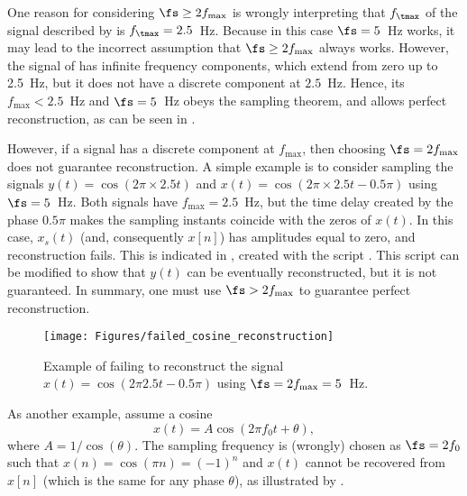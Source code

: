 One reason for considering $\fs \ge 2 f_{\textrm{max}}$ is wrongly interpreting that $f_\tmax$ of the signal described by  is $f_\tmax=2.5$~Hz. Because in this case $\fs = 5$~Hz works, it may lead to the incorrect assumption that $\fs \ge 2 f_{\textrm{max}}$ always works.
However, the signal of  has infinite frequency components, which extend from zero up to 2.5~Hz, but it does
not have a discrete component at $2.5$~Hz. Hence, its $f_{\textrm{max}} < 2.5$~Hz and $\fs = 5$~Hz obeys the sampling theorem, and allows perfect reconstruction, as can be seen in .

However, if a signal has a discrete component at $f_{\textrm{max}}$, then choosing $\fs = 2 f_{\textrm{max}}$ does not guarantee
reconstruction. A simple example is to consider sampling the signals 
$y(t) = \cos (2 \pi \times 2.5 t)$ and $x(t) = \cos (2 \pi \times 2.5 t - 0.5 \pi)$ using $\fs = 5$~Hz. Both signals have $f_{\textrm{max}} = 2.5$~Hz, but the time
delay created by the phase $0.5 \pi$ makes the sampling instants coincide with the zeros of $x(t)$. In this case, $x_s(t)$ (and, consequently $x[n]$) has amplitudes equal to zero, and reconstruction fails. This is indicated in , created with the script . This script can be modified to show that $y(t)$ can be eventually reconstructed, but it is not guaranteed. In summary, one must use $\fs > 2 f_{\textrm{max}}$ to guarantee perfect reconstruction.


\begin{figure}
	\centering
		\texttt{[image: Figures/failed\_cosine\_reconstruction]}		
	\caption{Example of failing to reconstruct the signal $x(t) = \cos (2 \pi 2.5 t - 0.5 \pi)$ using $\fs = 2 f_{\textrm{max}} = 5$~Hz.\label{fig:failed_cosine_reconstruction}}
\end{figure}


As another example, assume a cosine 
	\begin{equation}
	x(t) = A \cos\left(2 \pi f_0 t + \theta \right),
	\label{eq:samplingCosineExample}
	\end{equation}	
where $A=1/\cos(\theta)$. The sampling frequency is (wrongly) chosen as $\fs=2f_0$ such that $x(n) = \cos(\pi n) = (-1)^n$ and $x(t)$ cannot be recovered from $x[n]$ (which is the same for any phase $\theta$), as illustrated by . 
	
